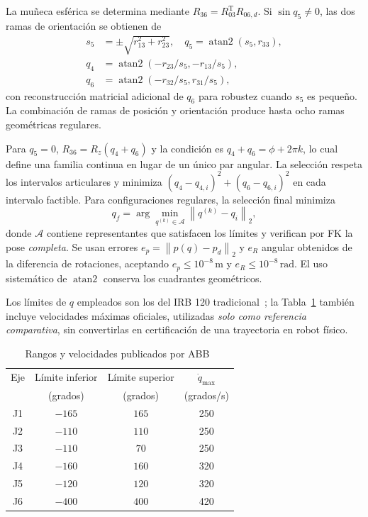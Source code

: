 \documentclass[conference,letterpaper]{IEEEtran}
\newcommand{\trans}{\mathrm{T}}
\newcommand{\norm}[1]{\left\lVert #1 \right\rVert}
\newcommand{\atanDos}{\operatorname{atan2}}
\begin{document}
	La muñeca esférica se determina mediante \(R_{36}=R_{03}^\trans R_{06,d}\). Si \(\sin q_5\neq0\), las dos ramas de orientación se obtienen de
	\begin{align}
		s_5&=\pm\sqrt{r_{13}^2+r_{23}^2},\quad q_5=\atanDos(s_5,r_{33}),\\
		q_4&=\atanDos(-r_{23}/s_5,-r_{13}/s_5),\\
		q_6&=\atanDos(-r_{32}/s_5,r_{31}/s_5),
	\end{align}
	con reconstrucción matricial adicional de \(q_6\) para robustez cuando \(s_5\) es pequeño. La combinación de ramas de posición y orientación produce hasta ocho ramas geométricas regulares.
	
	Para \(q_5=0\), \(R_{36}=R_z(q_4+q_6)\) y la condición es \(q_4+q_6=\phi+2\pi k\), lo cual define una familia continua en lugar de un único par angular. La selección respeta los intervalos articulares y minimiza \((q_4-q_{4,i})^2+(q_6-q_{6,i})^2\) en cada intervalo factible. Para configuraciones regulares, la selección final minimiza
	\begin{equation}
		q_f=\arg\min_{q^{(k)}\in\mathcal A}\norm{q^{(k)}-q_i}_2,
		\label{eq:sel}
	\end{equation}
	donde \(\mathcal A\) contiene representantes que satisfacen los límites y verifican por FK la pose \emph{completa}. Se usan errores \(e_p=\norm{p(q)-p_d}_2\) y \(e_R\) angular obtenidos de la diferencia de rotaciones, aceptando \(e_p\le10^{-8}\,\mathrm{m}\) y \(e_R\le10^{-8}\,\mathrm{rad}\). El uso sistemático de \(\atanDos\) conserva los cuadrantes geométricos.
	
	Los límites de \(q\) empleados son los del IRB 120 tradicional~\cite{abb}; la Tabla~\ref{tab:limites} también incluye velocidades máximas oficiales, utilizadas \emph{solo como referencia comparativa}, sin convertirlas en certificación de una trayectoria en robot físico.
	
	\begin{table}[!b]
		\caption{Rangos y velocidades publicados por ABB~\cite{abb}}
		\label{tab:limites}
		\centering\footnotesize
		\begin{tabular}{@{}cccc@{}}
			\toprule
			Eje & Límite inferior & Límite superior & \(\dot q_{\max}\) \\
			& (grados) & (grados) & (grados/s) \\
			\midrule
			J1 & $-165$ & $165$ & 250 \\
			J2 & $-110$ & $110$ & 250 \\
			J3 & $-110$ & $70$ & 250 \\
			J4 & $-160$ & $160$ & 320 \\
			J5 & $-120$ & $120$ & 320 \\
			J6 & $-400$ & $400$ & 420 \\
			\bottomrule
		\end{tabular}
	\end{table}
	
\end{document}
